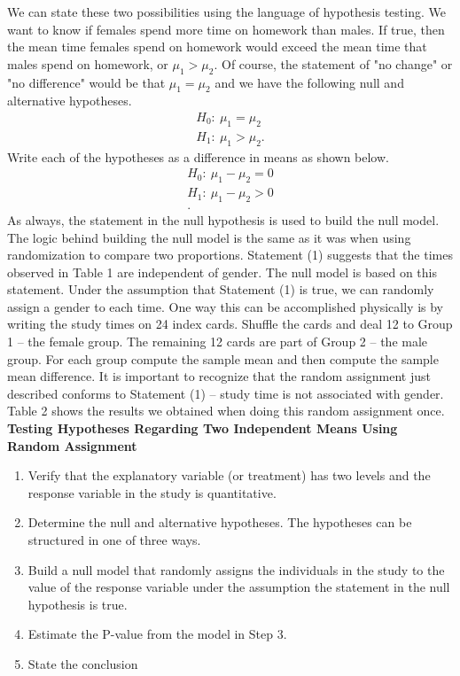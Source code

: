 \documentclass{report}
\begin{document}
    \bigbreak \noindent 
    We can state these two possibilities using the language of hypothesis testing. We want to know if females spend more time on homework than males. If true, then the mean time females spend on homework would exceed the mean time that males spend on homework, or $\mu_{1}> \mu_{2}$. Of course, the statement of "no change" or "no difference" would be that $\mu_{1} = \mu_{2} $ and we have the following null and alternative hypotheses.
    \bigbreak \noindent 
    \begin{align*}
       H_{0}:\ \mu_{1} = \mu_{2} \\
       H_{1}:\ \mu_{1} > \mu_{2}
    .\end{align*}
    \bigbreak \noindent 
    Write each of the hypotheses as a difference in means as shown below. 
    \begin{align*}
        H_{0}:\ \mu_{1} - \mu_{2} = 0 \\
        H_{1}:\ \mu_{1} - \mu_{2} > 0 \\
    .\end{align*}
    \bigbreak \noindent 
    As always, the statement in the null hypothesis is used to build the null model. The logic behind building the null model is the same as it was when using randomization to compare two proportions. Statement (1) suggests that the times observed in Table 1 are independent of gender. The null model is based on this statement. Under the assumption that Statement (1) is true, we can randomly assign a gender to each time. One way this can be accomplished physically is by writing the study times on 24 index cards. Shuffle the cards and deal 12 to Group 1 – the female group. The remaining 12 cards are part of Group 2 – the male group. For each group compute the sample mean and then compute the sample mean difference. It is important to recognize that the random assignment just described conforms to Statement (1) – study time is not associated with gender. Table 2 shows the results we obtained when doing this random assignment once.
    \pagebreak \bigbreak \noindent 
    \textbf{Testing Hypotheses Regarding Two Independent Means Using Random Assignment}
    \bigbreak \noindent 
    \begin{enumerate}
        \item Verify that the explanatory variable (or treatment) has two levels and the response variable in the study is quantitative.
        \item Determine the null and alternative hypotheses. The hypotheses can be structured in one of three ways.
        \item Build a null model that randomly assigns the individuals in the study to the value of the response variable under the assumption the statement in the null hypothesis is true.
        \item Estimate the P-value from the model in Step 3.
        \item State the conclusion
    \end{enumerate}
\end{document}
